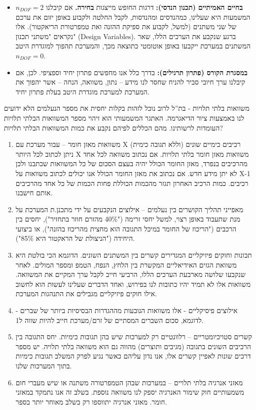 \documentclass[
  hebrew,
  letterpaper,
  DIV=11,
  numbers=noendperiod]{scrreprt}
\begin{document}
\begin{itemize}
\item
  \textbf{בחיים האמיתיים (תכנון הנדסי):} דרגות החופש מייצגות
  \textbf{בחירה.} אם קיבלנו \(n_{DOF} = 2\) המשמעות היא שעלינו, כמהנדסים
  ומהנדסות, לקבל החלטה ולקבוע באופן יזום את ערכם של שני משתנים (למשל,
  לקבוע את ספיקת ההזנה ואת טמפרטורת הריאקטור). אלו נקראים "משתני תכנון"
  (Design Variables). ברגע שנקבע את הערכים הללו, שאר המשתנים במערכת
  ייקבעו באופן אוטומטי כתוצאה מכך, והמערכת תהפוך למוגדרת היטב
  \(n_{DOF} = 0\).
\item
  \textbf{במסגרת הקורס (פתרון תרגילים):} בדרך כלל אנו מחפשים פתרון יחיד
  וספציפי. לכן, אם קיבלנו ערך חיובי סביר להניח שחסר לנו מידע -- נתון,
  משוואה, הנחה -- אשר יהפוך את המערכת למערכת מוגדרת היטב בעלת פתרון
  יחיד.
\end{itemize}

משוואות בלתי תלויות - בת''ל לרוב נוכל לזהות בקלות יחסית את מספר הנעלמים
הלא ידועים לנו באמצעות ציור הדיאגרמה. האתגר המשמעותי הוא זיהוי מספר
המשוואות הבלתי תלויות העומדות לרשותינו. מהם הכללים לפיהם נקבע את כמות
המשוואות הבלתי תלויות?

\begin{enumerate}
\def\labelenumi{\arabic{enumi}.}
\item
  משוואות מאזן חומר -- עבור מערכת עם X רכיבים כימיים שונים (וללא תגובה
  כימית) ניתן לכתוב לכל היותר X משוואות מאזן חומר בלתי תלויות. אם נכתוב
  משוואה לכל אחד מהרכיבים בנפרד, מאזן החומר הכולל יהיה בעצם הסכום של כל
  המשוואות שכתבנו ולכן לא יתן מידע חדש. אם נכתוב את מאזן החומר הכולל אנו
  יכולים לכתוב משוואות על X-1 רכיבים. כמות הרכיב האחרון תגזר מהכמות
  הכוללת פחות הכמות של כל אחד מהרכיבים אותם חישבנו.
\item
  מאפייני תהליך הקושרים בין נעלמים -- אילוצים הנקבעים על ידי מתכנן.ת
  המערכת על מנת שתעבוד באופן רצוי, למשל יחסי זרימה ("40\% מהזרם חוזר
  בתחזיר"), יחסים בין הרכבים ("הריכוז של החומר במיכל התגובה הוא מחצית
  מהריכוז בהזנה"), או ביצועי היחידה ("הניצולת של הראקטור היא 85\%").
\item
  תכונות וחוקים פיזיקליים המגדירים קשרים בין המשתנים השונים. הדוגמא הכי
  בולטת היא משוואת הגזים האידיאליים המקשרת בין הלחץ, הנפח,
  הטמפ\textquotesingle{} ומספר המולים. לאחר שנקבעו שלושה מארבעת הערכים
  הללו, הרביעי חייב לקבל ערך המקיים את המשוואה. משוואות אלו לא תמיד יהיו
  כתובות לנו בפירוש, ואחד הדברים שעלינו לעשות הוא לחשוב אילו חוקים
  פיזיקליים מגבילים את התנהגות המערכת.
\item
  אילוצים פיסיקליים - אלו משוואות הנובעות מההגדרות הבסיסיות ביותר של
  שברים -לדוגמא, סכום השברים המסתיים של זרם/מערכת חייב להיות שווה ל1.
\item
  קשרים סטויכיומטריים -- רלוונטיים רק למערכות שיש בהן תגובות כימיות. יחס
  התגובה בין הרכיבים השונים בתגובה (מגיבים ותוצרים) מהווה גם הוא משוואה
  בלתי תלויה. יש מספר דרכים שונות לאפיין קשרים אלו, אנו נדון עליהם כאשר
  נגיע לפרק המשלב תגובות כימיות בתוך המערכות שלנו.
\item
  מאזני אנרגיה בלתי תלויים -- במערכות שבהן הטמפרטורה משתנה או שיש מעברי
  חום משמעותיים חוק שימור האנרגיה יספק לנו משוואה נוספת. בשלב זה אנו
  נתמקד במאזני חומר. מאזני אנרגיה יתווספו רק בשלב מאוחר יותר בספר.\\
\end{enumerate}
\end{document}
